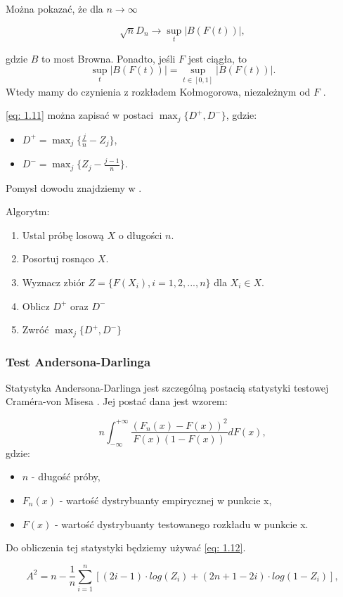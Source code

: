 \documentclass{article}
\theoremstyle{break}
\numberwithin{equation}{subsection}
\numberwithin{figure}{section}
\begin{document}
Można pokazać, że dla $n\rightarrow\infty$

$$\sqrt{n}D_n \rightarrow \sup_t|B(F(t))|,$$

gdzie $B$ to most Browna. Ponadto, jeśli $F$ jest ciągła, to $$\sup_t|B(F(t))|=\sup_{t\in[0,1]}|B(F(t))|. $$
Wtedy mamy do czynienia z rozkładem Kołmogorowa, niezależnym od $F$ \cite{R. M. Dudley}.

\eqref{eq: 1.11} można zapisać w postaci $\max_j \{D^{+}, D^{-}\}$, gdzie:

\begin{itemize}
\item $D^{+} = \max_j\{\frac{j}{n} - Z_j\}$,
\item $D^{-} = \max_j\{Z_j - \frac{j-1}{n}\}$.
\end{itemize}

Pomysł dowodu znajdziemy w \cite{goodnes}.

Algorytm:

\begin{enumerate}
\item Ustal próbę losową $X$ o długości $n$.
\item Posortuj rosnąco $X$.
\item Wyznacz zbiór $Z = \{F(X_i), i = 1, 2, ..., n\}$ dla $X_i \in X$.
\item Oblicz $D^{+}$ oraz $D^{-}$
\item Zwróć $\max_j \{D^{+}, D^{-}\}$
\end{enumerate}

\subsubsection{Test Andersona-Darlinga}

Statystyka Andersona-Darlinga jest szczególną postacią statystyki testowej Craméra-von Misesa \cite{burnecki}.
Jej postać dana jest wzorem:

$$n\int_{-\infty}^{+\infty} \frac{(F_n(x) - F(x))^2}{F(x)(1-F(x))}dF(x),$$ gdzie:


\begin{itemize}
\item $n$ - długość próby,
\item $F_n(x)$ - wartość dystrybuanty empirycznej w punkcie x,
\item $F(x)$ - wartość dystrybuanty testowanego rozkładu w punkcie x.
\end{itemize}
Do obliczenia tej statystyki będziemy używać \eqref{eq: 1.12}.

\begin{equation}
A^2 = n - \frac{1}{n}\sum_{i=1}^{n}[(2i-1)\cdot log(Z_i) + (2n+1-2i)\cdot log(1-Z_i)], \label{eq: 1.12}
\end{equation}
\end{document}
